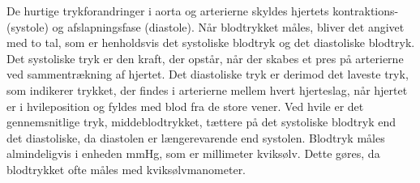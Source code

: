 De hurtige trykforandringer i aorta og arterierne skyldes hjertets kontraktions- (systole) og afslapningsfase (diastole). Når blodtrykket måles, bliver det angivet med to tal, som er henholdsvis det systoliske blodtryk og det diastoliske blodtryk. Det systoliske tryk er den kraft, der opstår, når der skabes et pres på arterierne ved sammentrækning af hjertet. Det diastoliske tryk er derimod det laveste tryk, som indikerer trykket, der findes i arterierne mellem hvert hjerteslag, når hjertet er i hvileposition og fyldes med blod fra de store vener. 
Ved hvile er det gennemsnitlige tryk, middeblodtrykket, tættere på det systoliske blodtryk end det diastoliske, da diastolen er længerevarende end systolen. 
Blodtryk måles almindeligvis i enheden mmHg, som er millimeter kviksølv. Dette gøres, da blodtrykket ofte måles med kviksølvmanometer. \\\\
